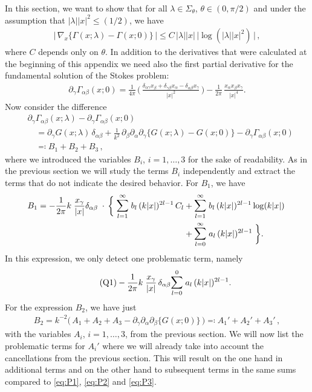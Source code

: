 In this section, we want to show that for all $\lambda \in \Sigma_\theta$, $\theta \in (0,\pi/2)$ and under the assumption that $|\lambda| |x|^2 \leq (1/2)$, we have
\begin{align*}
  \Big|\, \nabla_x \big\{ \Gamma(x; \lambda) - \Gamma(x; 0) \big\} \, \Big| \leq C\, |\lambda| |x| \, \big|\log(|\lambda| |x|^2)\,\big|\,,
\end{align*}
where $C$ depends only on $\theta$.
In addition to the derivatives that were calculated at the beginning of this appendix we need also the first partial derivative for the fundamental solution of the Stokes problem:
\begin{align*}
  \partial_\gamma \Gamma_{\alpha\beta} (x; 0) 
  = \frac{1}{4 \pi}\, \bigg(\, \frac{\delta_{\alpha\gamma} x_\beta + \delta_{\gamma\beta} x_\alpha  - \delta_{\alpha\beta} x_\gamma}{|x|^2}  \, \bigg) 
  - \frac{1}{2\pi}\, \frac{x_\alpha x_\beta x_\gamma}{|x|^4} .
\end{align*}
Now consider the difference
\begin{align*}
  &\partial_\gamma \Gamma_{\alpha\beta}(x; \lambda) - \partial_\gamma \Gamma_{\alpha\beta}(x; 0) \\
  &\quad=\partial_\gamma G(x; \lambda) \,\delta_{\alpha\beta}
  + \frac{1}{k^2} \, \partial_\beta \partial_\alpha \partial_\gamma \Big\{ G(x; \lambda) - G(x; 0) \Big\} 
  - \partial_\gamma \Gamma_{\alpha\beta}(x; 0) \\
  &\quad\eqqcolon B_1 + B_2 + B_3 \,,
\end{align*}
where we introduced the variables $B_i$, $i = 1,\dots,3$ for the sake of readability.
As in the previous section we will study the terms $B_i$ independently and extract the terms that do not indicate the desired behavior.
For $B_1$, we have
\begin{align*}
  B_1 = -\frac{1}{2\pi} k\;  \frac{x_\gamma}{|x|} \delta_{\alpha\beta} \;
  \cdot \,\bigg\{ \;
  \mathlarger{\sum}_{l = 1}^\infty \; b_l \, (k|x|)^{2l - 1} \, C_l 
  &+ \mathlarger{\sum}_{l = 1}^\infty \; b_l \, (k|x|)^{2l - 1} \log(k|x|) \; \\
  &+  \mathlarger{\sum}_{l = 0}^\infty \; a_l \, (k|x|)^{2l - 1} \; \bigg\}.
\end{align*}
In this expression, we only detect one problematic term, namely
\begin{align}
  \label{eq:Q1}
  \tag{Q1}
  -\frac{1}{2\pi} k\;  \frac{x_\gamma}{|x|}\, \delta_{\alpha\beta} \mathlarger{\sum}_{l = 0}^0 \; a_l \, (k|x|)^{2l - 1} .
\end{align}
For the expression $B_2$, we have just 
\begin{align*}
  B_2 = k^{-2} \Big( \, A_1 + A_2 + A_3 - \partial_\gamma\partial_\alpha\partial_\beta \Big\{ G(x; 0)\Big\} \, \Big) \eqqcolon A_1' + A_2' + A_3'\,,
\end{align*}
with the variables $A_i$, $i = 1, \dots, 3$, from the previous section. 
We will now list the problematic terms for $A_i'$ where we will already take into account the cancellations from the previous section.
This will result on the one hand in additional terms and on the other hand to subsequent terms in the same sums compared to \eqref{eq:P1}, \eqref{eq:P2} and \eqref{eq:P3}.

